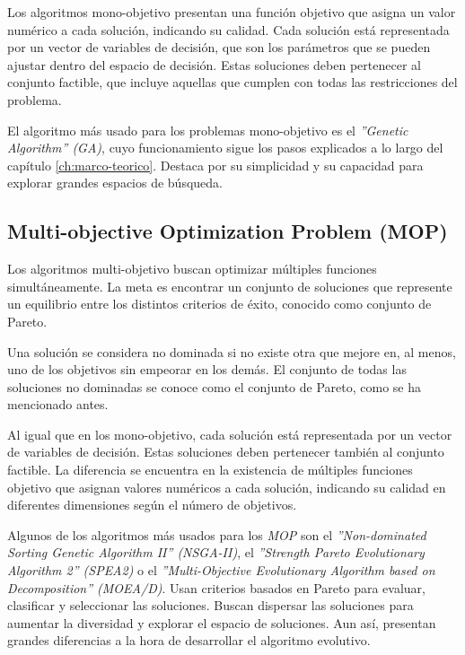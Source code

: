 Los algoritmos mono-objetivo presentan una función objetivo que asigna un valor numérico a cada solución, indicando su calidad. Cada solución está representada por un vector de variables de decisión, que son los parámetros que se pueden ajustar dentro del espacio de decisión. Estas soluciones deben pertenecer al conjunto factible, que incluye aquellas que cumplen con todas las restricciones del problema.

El algoritmo más usado para los problemas mono-objetivo es el \textit{''Genetic Algorithm'' (GA)}, cuyo funcionamiento sigue los pasos explicados a lo largo del capítulo \ref{ch:marco-teorico}. Destaca por su simplicidad y su capacidad para explorar grandes espacios de búsqueda.

\subsection{Multi-objective Optimization Problem (MOP)}

Los algoritmos multi-objetivo buscan optimizar múltiples funciones simultáneamente. La meta es encontrar un conjunto de soluciones que represente un equilibrio entre los distintos criterios de éxito, conocido como conjunto de Pareto.

Una solución se considera no dominada si no existe otra que mejore en, al menos, uno de los objetivos sin empeorar en los demás. El conjunto de todas las soluciones no dominadas se conoce como el conjunto de Pareto, como se ha mencionado antes.

Al igual que en los mono-objetivo, cada solución está representada por un vector de variables de decisión. Estas soluciones deben pertenecer también al conjunto factible. La diferencia se encuentra en la existencia de múltiples funciones objetivo que asignan valores numéricos a cada solución, indicando su calidad en diferentes dimensiones según el número de objetivos.

Algunos de los algoritmos más usados para los \textit{MOP} son el \textit{''Non-dominated Sorting Genetic Algorithm II'' (NSGA-II)}, el \textit{''Strength Pareto Evolutionary Algorithm 2'' (SPEA2)} o el \textit{''Multi-Objective Evolutionary Algorithm based on Decomposition'' (MOEA/D)}. Usan criterios basados en Pareto para evaluar, clasificar y seleccionar las soluciones. Buscan dispersar las soluciones para aumentar la diversidad y explorar el espacio de soluciones. Aun así, presentan grandes diferencias a la hora de desarrollar el algoritmo evolutivo.

